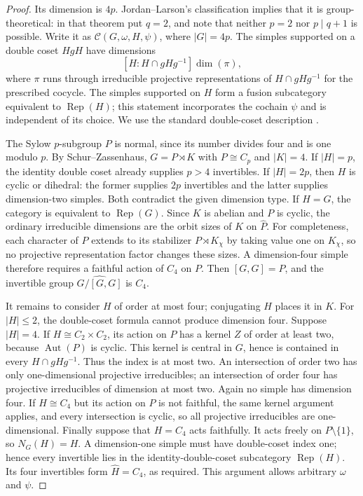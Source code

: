 \begin{proof}
Its dimension is $4p$. Jordan--Larson's classification
\cite[Theorem~1.1]{JordanLarson} implies that it is group-theoretical: in that theorem
put $q=2$, and note that neither $p=2$ nor $p\mid q+1$ is possible.
Write it as $\mathcal C(G,\omega,H,\psi)$, where $|G|=4p$.
The simples supported on a double coset $HgH$ have dimensions
\[
 [H:H\cap gHg^{-1}]\dim(\pi),
\]
where $\pi$ runs through irreducible projective representations of
$H\cap gHg^{-1}$ for the prescribed cocycle. The simples supported
on $H$ form a fusion subcategory equivalent to $\operatorname{Rep}(H)$;
this statement incorporates the cochain $\psi$ and is independent of
its choice. We use the standard double-coset description
\cite[Theorem~5.1]{GelakiNaidu}.

The Sylow $p$-subgroup $P$ is normal, since its number divides four
and is one modulo $p$. By Schur--Zassenhaus,
$G=P\rtimes K$ with $P\cong C_p$ and $|K|=4$.
If $|H|=p$, the identity double coset already supplies $p>4$
invertibles. If $|H|=2p$, then $H$ is cyclic or dihedral: the former
supplies $2p$ invertibles and the latter supplies dimension-two
simples. Both contradict the given dimension type.
If $H=G$, the category is equivalent to $\operatorname{Rep}(G)$.
Since $K$ is abelian and $P$ is cyclic, the ordinary irreducible
dimensions are the orbit sizes of $K$ on $\widehat P$.
For completeness, each character of $P$ extends to its stabilizer
$P\rtimes K_\chi$ by taking value one on $K_\chi$, so no projective
representation factor changes these sizes. A dimension-four simple
therefore requires a faithful action of $C_4$ on $P$.
Then $[G,G]=P$, and the invertible group
$\widehat{G/[G,G]}$ is $C_4$.

It remains to consider $H$ of order at most four; conjugating $H$
places it in $K$. For $|H|\leq2$, the double-coset formula cannot
produce dimension four. Suppose $|H|=4$.
If $H\cong C_2\times C_2$, its action on $P$ has a kernel $Z$ of
order at least two, because $\operatorname{Aut}(P)$ is cyclic.
This kernel is central in $G$, hence is contained in every
$H\cap gHg^{-1}$. Thus the index is at most two. An intersection of
order two has only one-dimensional projective irreducibles; an
intersection of order four has projective irreducibles of dimension
at most two. Again no simple has dimension four.
If $H\cong C_4$ but its action on $P$ is not faithful, the same kernel
argument applies, and every intersection is cyclic, so all projective
irreducibles are one-dimensional. Finally suppose that $H=C_4$ acts
faithfully. It acts freely on $P\setminus\{1\}$, so
$N_G(H)=H$. A dimension-one simple must have double-coset index one;
hence every invertible lies in the identity-double-coset subcategory
$\operatorname{Rep}(H)$. Its four invertibles form $\widehat H=C_4$,
as required. This argument allows arbitrary $\omega$ and $\psi$.
\end{proof}

